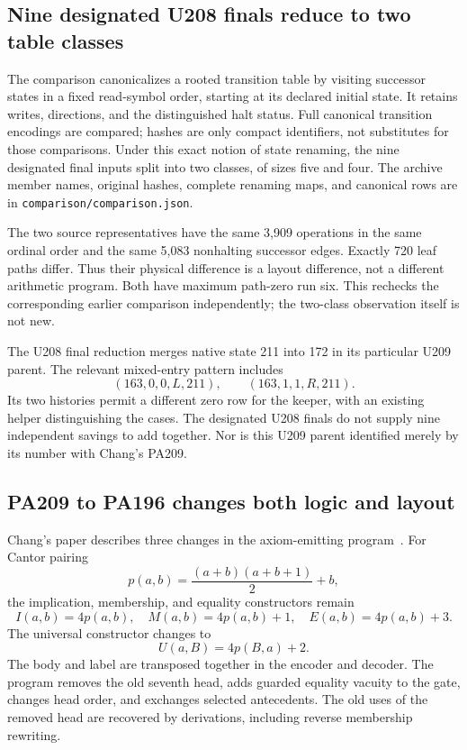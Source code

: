 \documentclass[11pt,letterpaper]{article}
\newcommand{\file}[1]{\texttt{\nolinkurl{#1}}}
\begin{document}
\subsection{Nine designated U208 finals reduce to two table classes}

The comparison canonicalizes a rooted transition table by visiting successor
states in a fixed read-symbol order, starting at its declared initial state.
It retains writes, directions, and the distinguished halt status. Full
canonical transition encodings are compared; hashes are only compact
identifiers, not substitutes for those comparisons. Under this exact notion
of state renaming, the nine designated final inputs split into two classes,
of sizes five and four. The archive member names, original hashes, complete
renaming maps, and canonical rows are in
\file{comparison/comparison.json}.

The two source representatives have the same 3,909 operations in the same
ordinal order and the same 5,083 nonhalting successor edges. Exactly 720 leaf
paths differ. Thus their physical difference is a layout difference, not a
different arithmetic program. Both have maximum path-zero run six.
This rechecks the corresponding earlier comparison independently; the
two-class observation itself is not new.

The U208 final reduction merges native state 211 into 172 in its particular
U209 parent. The relevant mixed-entry pattern includes
\[
 (163,0,0,L,211),\qquad(163,1,1,R,211).
\]
Its two histories permit a different zero row for the keeper, with an
existing helper distinguishing the cases. The designated U208 finals do
not supply nine independent savings to add together. Nor is this U209
parent identified merely by its number with Chang's PA209.

\subsection{PA209 to PA196 changes both logic and layout}

Chang's paper describes three changes in the axiom-emitting program~\cite{jpaper}.
For Cantor pairing
\[
 p(a,b)=\frac{(a+b)(a+b+1)}2+b,
\]
the implication, membership, and equality constructors remain
\[
 I(a,b)=4p(a,b),\quad M(a,b)=4p(a,b)+1,\quad E(a,b)=4p(a,b)+3.
\]
The universal constructor changes to
\[
 U(a,B)=4p(B,a)+2.
\]
The body and label are transposed together in the encoder and decoder.
The program removes the old seventh head, adds guarded equality vacuity to
the gate, changes head order, and exchanges selected antecedents. The old
uses of the removed head are recovered by derivations, including reverse
membership rewriting.
\end{document}
